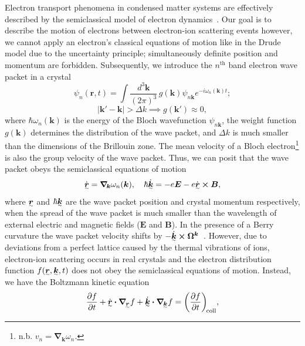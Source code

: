 \documentclass[11pt, a4paper]{article}
\newcommand{\ut}[1]{%
  \smash{\ensurestackMath{\stackengine{1pt}{#1}{\scriptscriptstyle\sim}{U}{c}{F}{F}{S}}}
  \vphantom{#1}
}
\begin{document}
Electron transport phenomena in condensed matter systems
are effectively described by the semiclassical model
of electron dynamics~\cite{Ashcroft:102652}. Our goal is to describe the motion of electrons 
between electron-ion scattering events however, we cannot apply an electron's classical 
equations of motion like in the Drude model due to
the uncertainty principle; simultaneously definite position
and momentum are forbidden. Subsequently, we introduce the $n^\text{th}$ band
electron wave packet in a crystal
\begin{equation}
\psi_n(\bm{r}, t) = \int{\frac{d^3\bm{k}}{{(2\pi)}^3}\,
  g(\bm{k}) \psi_{n\bm{k}} e^{-i\omega_n(\bm{k})t} };
\end{equation}
\begin{equation}
  |\bm{k}' - \bm{k}| > \Delta k \implies g(\bm{k}') \approx 0,
\end{equation}
where $\hbar \omega_n(\bm{k})$ is the energy of the Bloch wavefunction $\psi_{n\bm{k}}$,
the weight function $g(\bm{k})$ determines the distribution of the wave packet,
and $\Delta k$ is much smaller than the dimensions of the Brillouin zone.
The mean velocity of a Bloch electron\footnote{n.b. $v_n = \bm{\nabla_k}\omega_n$.}
is also the group velocity of the wave packet. Thus, we can posit that
the wave packet obeys the semiclassical equations of motion
\begin{equation}
  \dot{\ut{\bm{r}}} = \bm{\nabla_{\! k}} \omega_n(\bm{k}), \quad
  \hbar \dot{\ut{\bm{k}}} = - e\bm{E} - e \dot{\ut{\bm{r}}} \bm{ \times B},
\end{equation}
where $\ut{\bm{r}}$ and $\hbar\ut{\bm{k}}$ are
the wave packet position and crystal momentum respectively,
when the spread of the wave packet is much smaller than
the wavelength of external electric and magnetic fields ($\bm{E}$ and $\bm{B}$).
In the presence of a Berry curvature the wave packet velocity
shifts by $- \dot{\ut{\bm{k}}} \bm{\times} \bm{\Omega}^{\bm{k}}$~\cite{BerryCurveTerm}.
However, due to deviations from a perfect lattice caused by the thermal vibrations
of ions, electron-ion scattering occurs in real crystals and the electron distribution function
$f(\ut{\bm{r}}, \ut{\bm{k}}, t)$ does not obey the semiclassical equations of motion. Instead,
we have the Boltzmann kinetic equation
\begin{equation}
\frac{\partial f}{\partial t} + \dot{\ut{\bm{r}}} \bm{ \cdot}
\bm{\nabla}_{\! \scriptsize{\ut{\bm{r}}} }{f}
+ \dot{\ut{\bm{k}}} \bm{\cdot} \bm{\nabla}_{\! \scriptsize{\ut{\bm{k}} }}{f} =
{\left(\frac{\partial f}{\partial t} \right)}_{\!\text{coll}},
\end{equation}
\end{document}
